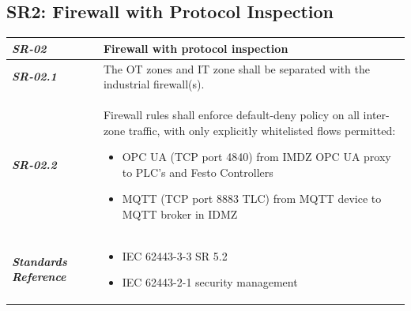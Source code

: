 \documentclass[11pt,a4paper]{article}
\begin{document}
\subsection{SR2: Firewall with Protocol Inspection}\label{SR2}
\begin{tabularx}{\textwidth}{>{\bfseries}p{2.5cm} X}
    \textit{SR-02} & \textbf{Firewall with protocol inspection} \vspace{0.5em}\\
\toprule
\textit{SR-02.1} &
    The OT zones and IT zone shall be separated with the industrial firewall(s).
    \vspace{0.5em}
\\
\textit{SR-02.2} &
Firewall rules shall enforce default-deny policy on all inter-zone traffic,
with only explicitly whitelisted flows permitted:
\begin{itemize}[label=-, itemsep=0pt, topsep=2pt]
    \item OPC UA (TCP port 4840) from IMDZ OPC UA proxy to PLC's and Festo Controllers
    \item MQTT (TCP port 8883 TLC) from MQTT device to MQTT broker in IDMZ
\end{itemize} \vspace{1em}
    \\
\midrule
    \textit{Standards Reference} &
\begin{itemize}[label=-, noitemsep, topsep=0pt, leftmargin=*]
    \item IEC 62443-3-3 SR 5.2
    \item IEC 62443-2-1 security management
\end{itemize} \vspace{1em} \\ 
\end{tabularx}
\vspace{2em}

\end{document}
